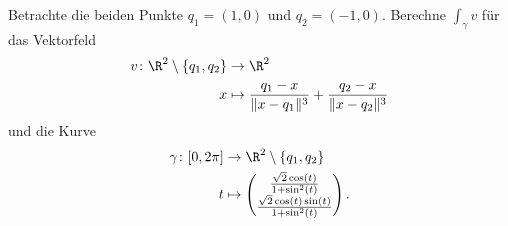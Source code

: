 \begin{prob}
Betrachte die beiden Punkte $q_1 = (1,0)$ und $q_2 = (-1,0)$. Berechne $\int_\gamma v$ f\"ur das Vektorfeld
\begin{equation*}
    \begin{split}
        v \colon \R^2\setminus \{ q_1, q_2\} &\to \R^2 \\
        x &\mapsto \frac{q_1-x}{\rVert x - q_1 \lVert^3} + \frac{q_2-x}{\rVert x - q_2 \lVert^3}
    \end{split}
\end{equation*}
und die Kurve 
\begin{equation*}
    \begin{split}
    \gamma \colon [0,2\pi] &\to \R^2\setminus \{ q_1, q_2\}\\
    t&\mapsto\begin{pmatrix}
    \frac{\sqrt{2}\cos(t)}{1+\sin^2(t)}\\
    \frac{\sqrt{2}\cos(t)\sin(t)}{1+\sin^2(t)}
    \end{pmatrix}.
    \end{split}
\end{equation*}
\end{prob}
